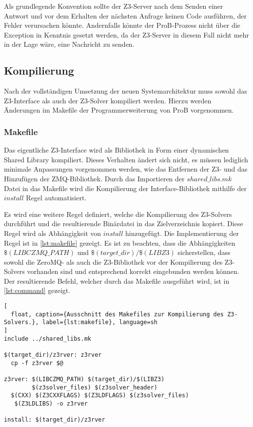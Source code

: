 Als grundlegende Konvention sollte der Z3-Server nach dem Senden einer Antwort und vor dem Erhalten der nächsten Anfrage keinen Code ausführen, der Fehler verursachen könnte.
Andernfalls könnte der ProB-Prozess nicht über die Exception in Kenntnis gesetzt werden, da der Z3-Server in diesem Fall nicht mehr in der Lage wäre, eine Nachricht zu senden.

\subsection{Kompilierung}

Nach der vollständigen Umsetzung der neuen Systemarchitektur muss sowohl das Z3-Interface als auch der Z3-Solver kompiliert werden.
Hierzu werden Änderungen im Makefile der Programmerweiterung von ProB vorgenommen.

\subsubsection{Makefile}

Das eigentliche Z3-Interface wird als Bibliothek in Form einer dynamischen Shared Library kompiliert.
Dieses Verhalten ändert sich nicht, es müssen lediglich minimale Anpassungen vorgenommen werden, wie das Entfernen der Z3- und das Hinzufügen der ZMQ-Bibliothek.
Durch das Importieren der $shared\_libs.mk$ Datei in das Makefile wird die Kompilierung der Interface-Bibliothek mithilfe der $install$ Regel automatisiert. 

Es wird eine weitere Regel definiert, welche die Kompilierung des Z3-Solvers durchführt und die resultierende Binärdatei in das Zielverzeichnis kopiert.
Diese Regel wird als Abhängigkeit von $install$ hinzugefügt.
Die Implementierung der Regel ist in \cref{lst:makefile} gezeigt.
Es ist zu beachten, dass die Abhängigkeiten $\$(LIBCZMQ\_PATH)$ und $\$(target\_dir)/\$(LIBZ3)$ sicherstellen,
dass sowohl die ZeroMQ- als auch die Z3-Bibliothek vor der Kompilierung des Z3-Solvers vorhanden sind und entsprechend korrekt eingebunden werden können.
Der resultierende Befehl, welcher durch das Makefile ausgeführt wird, ist in \cref{lst:command} gezeigt.

\begin{lstlisting}[
  float, caption={Ausschnitt des Makefiles zur Kompilierung des Z3-Solvers.}, label={lst:makefile}, language=sh
]
include ../shared_libs.mk

$(target_dir)/z3rver: z3rver
  cp -f z3rver $@

z3rver: $(LIBCZMQ_PATH) $(target_dir)/$(LIBZ3)
        $(z3solver_files) $(z3solver_header)
  $(CXX) $(Z3CXXFLAGS) $(Z3LDFLAGS) $(z3solver_files)
   $(Z3LDLIBS) -o z3rver

install: $(target_dir)/z3rver
\end{lstlisting}

